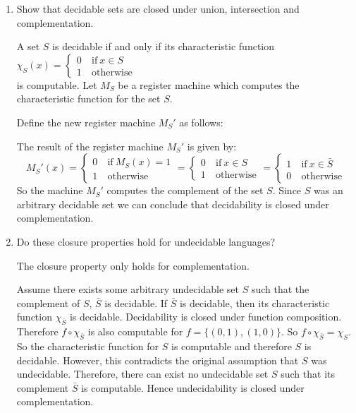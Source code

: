 \documentclass[10pt,\jkfside,a4paper]{article}
\begin{document}
\begin{enumerate}[label=(\alph*)]

\item Show that decidable sets are closed under union, intersection and
complementation.

A set $S$ is decidable if and only if its characteristic function $\chi_S(x) =
\begin{cases} 0 & \ \text{if} \ x \in S \\ 1 & \ \text{otherwise} \
\end{cases}$ \\ is computable. Let $M_S$ be a register machine which computes
the characteristic function for the set $S$.

Define the new register machine $M_S'$ as follows:
\begin{center}
\end{center}

The result of the register machine $M_S'$ is given by:
\[
M_S'(x) =
\begin{cases}
0 & \ \text{if} \ M_S(x) = 1 \\
1 & \ \text{otherwise}
\end{cases}
= \begin{cases}
0 & \ \text{if} \ x \in S \\
1 & \ \text{otherwise}
\end{cases}
= \begin{cases}
1 & \ \text{if} \ x \in \bar{S} \\
0 & \ \text{otherwise}
\end{cases}
\]
So the machine $M_S'$ computes the complement of the set $S$. Since $S$ was
an arbitrary decidable set we can conclude that decidability is closed
under complementation.

\item Do these closure properties hold for undecidable languages?

The closure property only holds for complementation.

Assume there exists some arbitrary undecidable set $S$ such that the
complement of $S$, $\bar{S}$ is decidable. If $\bar{S}$ is decidable, then
its characteristic function $\chi_{\bar{S}}$ is decidable. Decidability is
closed under function composition. Therefore $f \circ \chi_{\bar{S}}$ is
also computable for $f = \{(0, 1), (1, 0)\}$. So $f \circ \chi_{\bar{S}} =
\chi_S$. So the characteristic function for $S$ is computable and therefore
$S$ is decidable. However, this contradicts the original assumption that $S$
was undecidable. Therefore, there can exist no undecidable set $S$ such
that its complement $\bar{S}$ is computable. Hence undecidability is closed
under complementation.


\end{enumerate}
\end{document}
